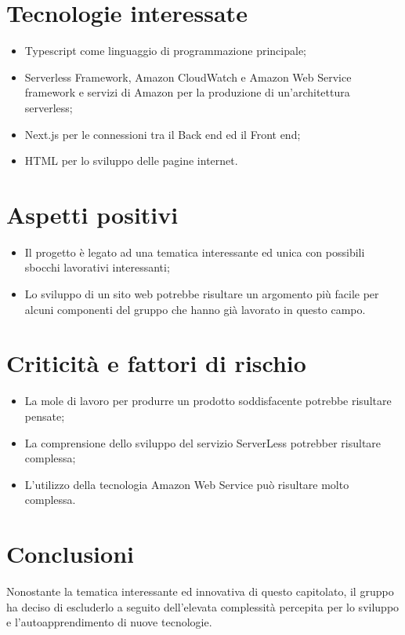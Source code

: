 \section{Tecnologie interessate}
\begin{itemize}
	\item Typescript come linguaggio di programmazione principale;
	\item Serverless Framework, Amazon CloudWatch e Amazon Web Service framework e servizi di Amazon per la produzione di un'architettura serverless;
	\item Next.js per le connessioni tra il Back end ed il Front end;
	\item HTML per lo sviluppo delle pagine internet.
\end{itemize}
\section{Aspetti positivi}
\begin{itemize}
	\item Il progetto è legato ad una tematica interessante ed unica con possibili sbocchi lavorativi interessanti;
	\item Lo sviluppo di un sito web potrebbe risultare un argomento più facile per alcuni componenti del gruppo che hanno già lavorato in questo campo.
\end{itemize}
\section{Criticità e fattori di rischio}
\begin{itemize}
	\item La mole di lavoro per produrre un prodotto soddisfacente potrebbe risultare pensate;
	\item La comprensione dello sviluppo del servizio ServerLess potrebber risultare complessa;
	\item L'utilizzo della tecnologia Amazon Web Service può risultare molto complessa.
\end{itemize}
\section{Conclusioni}
Nonostante la tematica interessante ed innovativa di questo capitolato, il gruppo ha deciso di escluderlo a seguito dell'elevata complessità percepita per lo sviluppo e l'autoapprendimento di nuove tecnologie.
